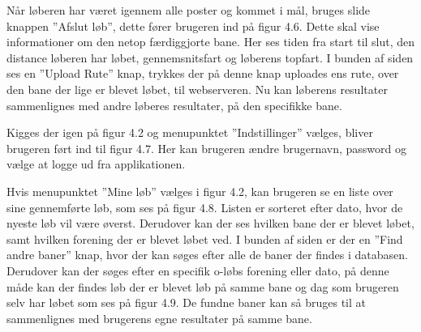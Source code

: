 Når løberen har været igennem alle poster og kommet i mål, bruges slide knappen ”Afslut løb”, dette fører brugeren ind på figur 4.6. Dette skal vise informationer om den netop færdiggjorte bane. Her ses tiden fra start til slut, den distance løberen har løbet, gennemsnitsfart og løberens topfart. I bunden af siden ses en ”Upload Rute” knap, trykkes der på denne knap uploades ens rute, over den bane der lige er blevet løbet, til webserveren. Nu kan løberens resultater sammenlignes med andre løberes resultater, på den specifikke bane.

Kigges der igen på figur 4.2 og menupunktet ”Indstillinger” vælges, bliver brugeren ført ind til figur 4.7. Her kan brugeren ændre brugernavn, password og vælge at logge ud fra applikationen.

Hvis menupunktet ”Mine løb” vælges i figur 4.2, kan brugeren se en liste over sine gennemførte løb, som ses på figur 4.8. Listen er sorteret efter dato, hvor de nyeste løb vil være øverst. Derudover kan der ses hvilken bane der er blevet løbet, samt hvilken forening der er blevet løbet ved. I bunden af siden er der en ”Find andre baner” knap, hvor der kan søges efter alle de baner der findes i databasen. Derudover kan der søges efter en specifik o-løbs forening eller dato, på denne måde kan der findes løb der er blevet løb på samme bane og dag som brugeren selv har løbet som ses på figur 4.9. De fundne baner kan så bruges til at sammenlignes med brugerens egne resultater på samme bane.

